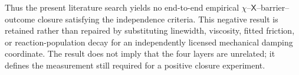 Thus the present literature search yields no end-to-end empirical
$\chi$--$\mathsf{X}$--barrier--outcome closure satisfying the independence
criteria.  This negative result is retained rather than repaired by
substituting linewidth, viscosity, fitted friction, or reaction-population
decay for an independently licensed mechanical damping coordinate.  The
result does not imply that the four layers are unrelated; it defines the
measurement still required for a positive closure experiment.

